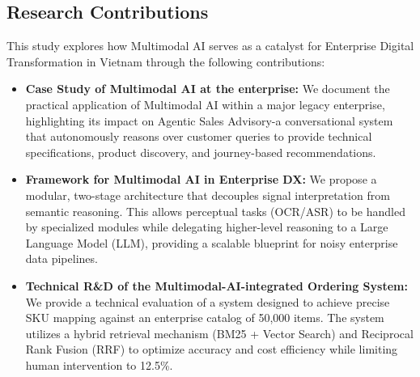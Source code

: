 \subsection{Research Contributions}
This study explores how Multimodal AI serves as a catalyst for Enterprise Digital Transformation in Vietnam through the following contributions:
\begin{itemize}
    \item \textbf{Case Study of Multimodal AI at the enterprise:} We document the practical application of Multimodal AI within a major legacy enterprise, highlighting its impact on Agentic Sales Advisory-a conversational system that autonomously reasons over customer queries to provide technical specifications, product discovery, and journey-based recommendations.
    \item \textbf{Framework for Multimodal AI in Enterprise DX:} We propose a modular, two-stage architecture that decouples signal interpretation from semantic reasoning. This allows perceptual tasks (OCR/ASR) to be handled by specialized modules while delegating higher-level reasoning to a Large Language Model (LLM), providing a scalable blueprint for noisy enterprise data pipelines.
    \item \textbf{Technical R\&D of the Multimodal-AI-integrated Ordering System:} We provide a technical evaluation of a system designed to achieve precise SKU mapping against an enterprise catalog of 50,000 items. The system utilizes a hybrid retrieval mechanism (BM25 + Vector Search) and Reciprocal Rank Fusion (RRF) to optimize accuracy and cost efficiency while limiting human intervention to 12.5\%.
\end{itemize}